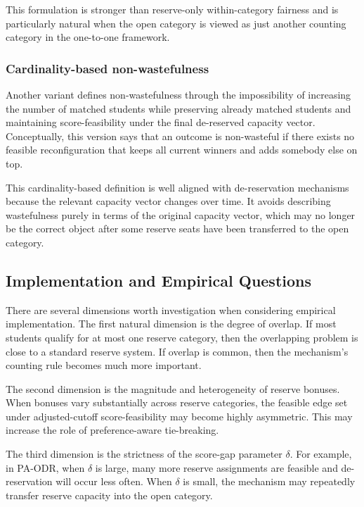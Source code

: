 \documentclass[12pt]{article}
\newcommand{\1}{\mathbf{1}}
\begin{document}
This formulation is stronger than reserve-only within-category fairness and is particularly natural when the open category is viewed as just another counting category in the one-to-one framework.

\subsubsection{Cardinality-based non-wastefulness}
Another variant defines non-wastefulness through the impossibility of increasing the number of matched students while preserving already matched students and maintaining score-feasibility under the final de-reserved capacity vector. Conceptually, this version says that an outcome is non-wasteful if there exists no feasible reconfiguration that keeps all current winners and adds somebody else on top.

This cardinality-based definition is well aligned with de-reservation mechanisms because the relevant capacity vector changes over time. It avoids describing wastefulness purely in terms of the original capacity vector, which may no longer be the correct object after some reserve seats have been transferred to the open category.

\subsection{Implementation and Empirical Questions}
There are several dimensions worth investigation when considering empirical implementation. The first natural dimension is the degree of overlap. If most students qualify for at most one reserve category, then the overlapping problem is close to a standard reserve system. If overlap is common, then the mechanism's counting rule becomes much more important.

The second dimension is the magnitude and heterogeneity of reserve bonuses. When bonuses vary substantially across reserve categories, the feasible edge set under adjusted-cutoff score-feasibility may become highly asymmetric. This may increase the role of preference-aware tie-breaking.

The third dimension is the strictness of the score-gap parameter $\delta$. For example, in PA-ODR, when $\delta$ is large, many more reserve assignments are feasible and de-reservation will occur less often. When $\delta$ is small, the mechanism may repeatedly transfer reserve capacity into the open category.
\end{document}
